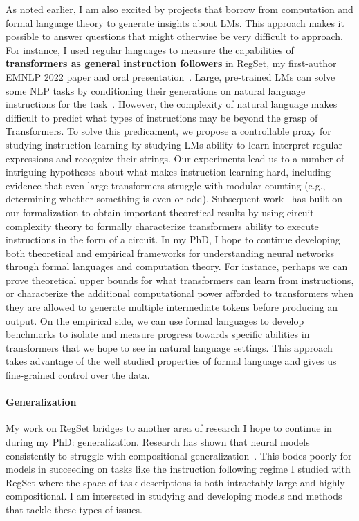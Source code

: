 \documentclass[11pt]{article}
\begin{document}
As noted earlier, I am also excited by projects 
that borrow from computation and formal language theory
to generate insights about LMs.
This approach makes it possible to answer 
questions that might otherwise be very difficult to approach.
For instance, I used regular languages
to measure the capabilities of 
\textbf{transformers as general instruction followers}
in RegSet, my first-author EMNLP 2022 paper 
and oral presentation~\cite{Finlayson2022WhatMI}. 
Large, pre-trained LMs can solve some NLP tasks 
by conditioning their generations on natural language instructions 
for the task~\cite{mishra2021crosstask, Wei2021FinetunedLM}. 
However, the complexity of natural language makes difficult to
predict what types of instructions may be beyond the grasp of Transformers.
To solve this predicament, 
we propose a controllable proxy for studying instruction learning
by studying LMs ability to learn interpret regular expressions
and recognize their strings.
Our experiments lead us to a number of intriguing hypotheses 
about what makes instruction learning hard, 
including evidence that even large transformers struggle with modular counting 
(e.g., determining whether something is even or odd). 
Subsequent work~\cite{Merrill2022LogPrecisionTA} 
has built on our formalization 
to obtain important theoretical results
by using circuit complexity theory
to formally characterize transformers ability to execute instructions in the form of a circuit.
In my PhD, I hope to continue developing both theoretical and empirical frameworks 
for understanding neural networks through formal languages and computation theory.
For instance, perhaps we can prove theoretical upper bounds 
for what transformers can learn from instructions,
or characterize the additional computational power 
afforded to transformers 
when they are allowed to generate multiple intermediate tokens 
before producing an output.
On the empirical side, we can use formal languages to develop benchmarks 
to isolate and measure progress towards specific abilities 
in transformers that we hope to see in natural language settings.
This approach takes advantage of the well studied properties of formal language
and gives us fine-grained control over the data.

\paragraph{Generalization}
My work on RegSet bridges to another area of research I hope to continue in during my PhD: generalization.
Research has shown that neural models consistently to struggle with
compositional generalization~\cite{Lake2018GeneralizationWS}. 
This bodes poorly for models in succeeding on tasks  
like the instruction following regime I studied with RegSet 
where the space of task descriptions is both intractably large 
and highly compositional.
I am interested in studying and developing models and methods
that tackle these types of issues.
\end{document}

